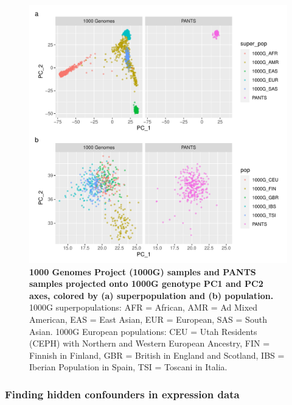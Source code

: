 \begin{figure}
    \centering
    \includegraphics[width=1.0\textwidth,page=1]{mainmatter/figures/chapter_04/pants_samples.sampleids_cleaned_to_lowercase.filtered.GRCh38.sorted.multiPANTS.projection_1000G_pca.pdf}
    \caption[
    ]{
        \textbf{1000 Genomes Project (1000G) samples and PANTS samples projected onto 1000G genotype PC1 and PC2 axes, colored by (a) superpopulation and (b) population.}
        1000G superpopulations: AFR = African, AMR = Ad Mixed American, EAS = East Asian, EUR = European, SAS = South Asian.
        1000G European populations: CEU = Utah Residents (CEPH) with Northern and Western European Ancestry, FIN = Finnish in Finland, GBR = British in England and Scotland, IBS = Iberian Population in Spain, TSI = Toscani in Italia.
    }
    \label{fig:multipants_genotype_akt_1000g_pca}
\end{figure}

\subsubsection{Finding hidden confounders in expression data}
\label{subsec:multiPANTS_reQTL_PEER}

